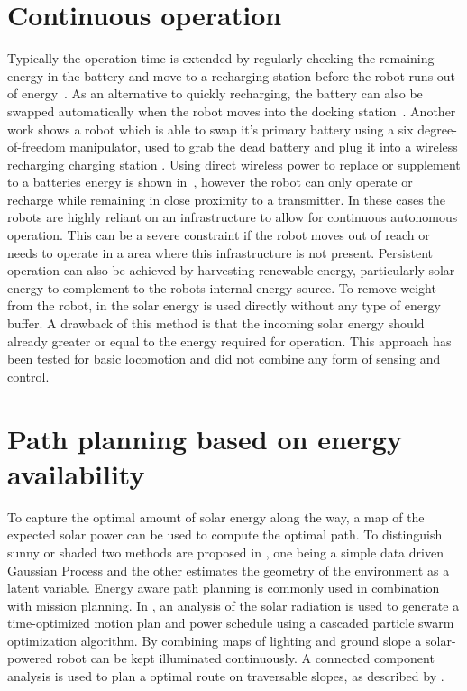 \section{Continuous operation} 

Typically the operation time is extended by regularly checking the remaining energy in the battery and move to a recharging station before the robot runs out of energy~\cite{pickem_icra_2015, rubenstein_icra_2012}.
As an alternative to quickly recharging, the battery can also be swapped automatically when the robot moves into the docking station~\cite{kemal_mech_2015}.
Another work shows a robot which is able to swap it's primary battery using a six degree-of-freedom manipulator, used to grab the dead battery and plug it into a wireless recharging charging station \cite{zhang_conel_2013}.
Using direct wireless power to replace or supplement to a batteries energy is shown in~\cite{karpelson_icra_2014}, however the robot can only operate or recharge while remaining in close proximity to a transmitter. 
In these cases the robots are highly reliant on an infrastructure to allow for continuous autonomous operation.
This can be a severe constraint if the robot moves out of reach or needs to operate in a area where this infrastructure is not present. Persistent operation can also be achieved by harvesting renewable energy, particularly solar energy to complement to the robots internal energy source. To remove weight from the robot, in \cite{bruhwiler_iros_2015} the solar energy is used directly without any type of energy buffer. A drawback of this method is that the incoming solar energy should already greater or equal to the energy required for operation. This approach has been tested for basic locomotion and did not combine any form of sensing and control.

\section{Path planning based on energy availability}

To capture the optimal amount of solar energy along the way, a map of the expected solar power can be used to compute the optimal path. To distinguish sunny or shaded two methods are proposed in \cite{plonski_tranro_2016}, one being a simple data driven Gaussian Process and the other estimates the geometry of the environment as a latent variable.
Energy aware path planning is commonly used in combination with mission planning.
In \cite{kaplan_iros_2016}, an analysis of the solar radiation is used to generate a time-optimized motion plan and power schedule using a cascaded particle swarm optimization algorithm.
By combining maps of lighting and ground slope a solar-powered robot can be kept illuminated continuously. A connected component analysis is used to plan a optimal route on traversable slopes, as described by \cite{otten_icra_2015}.



